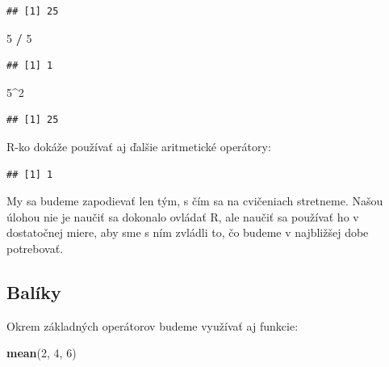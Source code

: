\documentclass[]{article}
\newenvironment{Shaded}{\begin{snugshade}}{\end{snugshade}}
\newcommand{\CommentTok}[1]{\textcolor[rgb]{0.56,0.35,0.01}{\textit{#1}}}
\newcommand{\DecValTok}[1]{\textcolor[rgb]{0.00,0.00,0.81}{#1}}
\newcommand{\KeywordTok}[1]{\textcolor[rgb]{0.13,0.29,0.53}{\textbf{#1}}}
\newcommand{\NormalTok}[1]{#1}
\newcommand{\OperatorTok}[1]{\textcolor[rgb]{0.81,0.36,0.00}{\textbf{#1}}}
\newcommand{\StringTok}[1]{\textcolor[rgb]{0.31,0.60,0.02}{#1}}
\begin{document}
\begin{verbatim}
## [1] 25
\end{verbatim}

\begin{Shaded}
\begin{Highlighting}[]
\DecValTok{5} \OperatorTok{/}\StringTok{ }\DecValTok{5}
\end{Highlighting}
\end{Shaded}

\begin{verbatim}
## [1] 1
\end{verbatim}

\begin{Shaded}
\begin{Highlighting}[]
\DecValTok{5}\OperatorTok{^}\DecValTok{2}
\end{Highlighting}
\end{Shaded}

\begin{verbatim}
## [1] 25
\end{verbatim}

R-ko dokáže používať aj ďalšie aritmetické operátory:

\begin{Shaded}
\end{Shaded}

\begin{verbatim}
## [1] 1
\end{verbatim}

My sa budeme zapodievať len tým, s čím sa na cvičeniach stretneme. Našou
úlohou nie je naučiť sa dokonalo ovládať R, ale naučiť sa používať ho v
dostatočnej miere, aby sme s ním zvládli to, čo budeme v najbližšej dobe
potrebovať.

\newpage

\hypertarget{baluxedky}{%
\subsection{Balíky}\label{baluxedky}}

Okrem základných operátorov budeme využívať aj funkcie:

\begin{Shaded}
\begin{Highlighting}[]
\KeywordTok{mean}\NormalTok{(}\DecValTok{2}\NormalTok{, }\DecValTok{4}\NormalTok{, }\DecValTok{6}\NormalTok{)}
\end{Highlighting}
\end{Shaded}
\end{document}
